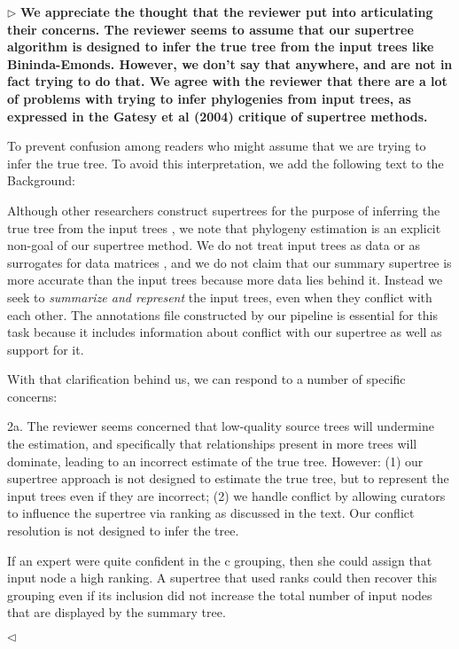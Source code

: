\documentclass{article}
\newenvironment{reply}{$\triangleright$\bf}{$\triangleleft$}
\renewenvironment{quote}
               {\list{}{\rightmargin\leftmargin}%
                \item\relax\normalfont}
               {\endlist}
\begin{document}
\begin{reply}
We appreciate the thought that the reviewer put into articulating their concerns. The reviewer seems to assume that our supertree algorithm is designed to infer the true tree from the input trees like Bininda-Emonds.  However, we don't say that anywhere, and are not in fact trying to do that.  We agree with the reviewer that there are a lot of problems with trying to infer phylogenies from input trees, as expressed in the Gatesy et al (2004) critique of supertree methods.

To prevent confusion among readers who might assume that we are trying to infer the true tree.  To avoid this interpretation, we add the following text to the Background:
\begin{quote}
Although other researchers construct supertrees for the purpose of
inferring the true tree from the input trees \citep{BinindaEmonds2007b,Davis2014},
we note that phylogeny estimation is an explicit non-goal of our
supertree method.  We do not treat input trees as data or as surrogates for
data matrices \citep{gatesy2004critique}, and we do not claim that our
summary supertree is more accurate than the input trees because more
data lies behind it. Instead we seek to \emph{summarize and represent}
the input trees, even when they conflict with each other.  The
annotations file constructed by our pipeline is essential for this
task because it includes information about conflict with our supertree
as well as support for it.
\end{quote}

With that clarification behind us, we can respond to a number of specific concerns:

2a. The reviewer seems concerned that low-quality source trees will undermine the estimation, and specifically that relationships present in more trees will dominate, leading to an incorrect estimate of the true tree. 
However: (1) our supertree approach is not designed to estimate the true tree, but to represent the input trees even if they are incorrect; (2) we handle conflict by allowing curators to influence the supertree via ranking as discussed in the text.  Our conflict resolution is not designed to infer the tree.

\begin{quote}
If an expert were quite confident in the c grouping, then she could assign that input node a high ranking. A supertree that used ranks could then recover this grouping even if its inclusion did not increase the total number of input nodes that are displayed by the summary tree.
\end{quote}


\end{reply}
\end{document}
